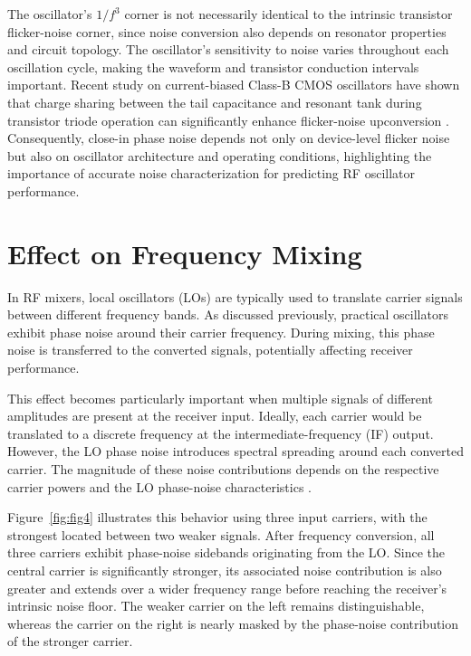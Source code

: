 \documentclass[10pt,a4paper]{article}
\begin{document}
	The oscillator's $1/f^3$ corner is not
	necessarily identical to the intrinsic transistor
	flicker-noise corner, since noise conversion also
	depends on resonator properties and circuit topology.
	The oscillator's sensitivity to noise varies throughout
	each oscillation cycle, making the waveform and transistor
	conduction intervals important. Recent study on
	current-biased Class-B CMOS oscillators have shown that
	charge sharing between the tail capacitance and resonant
	tank during transistor triode operation can significantly
	enhance flicker-noise upconversion \cite{Bevilacqua2026}. Consequently, close-in phase noise depends not only
	on device-level flicker noise but also on oscillator
	architecture and operating conditions, highlighting
	the importance of accurate noise characterization
	for predicting RF oscillator performance.
	
	
	
	\section{Effect on Frequency Mixing}
	
	In RF mixers, local oscillators (LOs) are typically used
	to translate carrier signals between different frequency
	bands. As discussed previously, practical oscillators
	exhibit phase noise around their carrier frequency.
	During mixing, this phase noise is transferred to the
	converted signals, potentially affecting receiver
	performance.
	
	This effect becomes particularly important when multiple
	signals of different amplitudes are present at the receiver
	input. Ideally, each carrier would be translated to a
	discrete frequency at the intermediate-frequency (IF)
	output. However, the LO phase noise introduces spectral
	spreading around each converted carrier. The magnitude
	of these noise contributions depends on the respective
	carrier powers and the LO phase-noise characteristics
	\cite{Grebenkemper1981}.
	
	Figure~\ref{fig:fig4} illustrates this behavior using
	three input carriers, with the strongest located between
	two weaker signals. After frequency conversion, all
	three carriers exhibit phase-noise sidebands originating
	from the LO. Since the central carrier is significantly
	stronger, its associated noise contribution is also
	greater and extends over a wider frequency range before
	reaching the receiver's intrinsic noise floor. The
	weaker carrier on the left remains distinguishable,
	whereas the carrier on the right is nearly masked by
	the phase-noise contribution of the stronger carrier.
	
\end{document}
